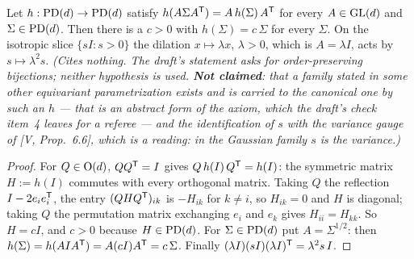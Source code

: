 \begin{lemma}
\label{lem:affine-gauge}
\leanok
Let $h : \mathrm{PD}(d) \to \mathrm{PD}(d)$ satisfy $h(A\Sigma A^{\mathsf{T}}) = A\,h(\Sigma)\,A^{\mathsf{T}}$ for every
$A \in \mathrm{GL}(d)$ and $\Sigma \in \mathrm{PD}(d)$. Then there is a $c > 0$ with $h(\Sigma) = c\,\Sigma$ for
every $\Sigma$. On the isotropic slice $\{sI : s > 0\}$ the dilation $x \mapsto \lambda x$,
$\lambda > 0$, which is $A = \lambda I$, acts by $s \mapsto \lambda^2 s$.
\statusT\quad\emph{(Cites nothing. The draft's statement asks for order-preserving bijections;
neither hypothesis is used. \textbf{Not claimed}: that a family stated in some other
equivariant parametrization exists and is carried to the canonical one by such an $h$ --- that is
an abstract form of the axiom, which the draft's check item~4 leaves for a referee --- and the
identification of $s$ with the variance gauge of [V, Prop.~6.6], which is a reading: in the
Gaussian family $s$ is the variance.)}
\end{lemma}

\begin{proof}
\leanok
For $Q \in \mathrm{O}(d)$, $QQ^{\mathsf{T}} = I$ gives $Q\,h(I)\,Q^{\mathsf{T}} = h(I)$: the symmetric matrix
$H := h(I)$ commutes with every orthogonal matrix. Taking $Q$ the reflection
$I - 2e_ie_i^{\mathsf{T}}$, the entry $(QHQ^{\mathsf{T}})_{ik}$ is $-H_{ik}$ for $k \ne i$, so $H_{ik} = 0$ and
$H$ is diagonal; taking $Q$ the permutation matrix exchanging $e_i$ and $e_k$ gives
$H_{ii} = H_{kk}$. So $H = cI$, and $c > 0$ because $H \in \mathrm{PD}(d)$. For $\Sigma \in \mathrm{PD}(d)$ put
$A = \Sigma^{1/2}$: then $h(\Sigma) = h(AIA^{\mathsf{T}}) = A(cI)A^{\mathsf{T}} = c\,\Sigma$. Finally
$(\lambda I)(sI)(\lambda I)^{\mathsf{T}} = \lambda^2 s\,I$.
\end{proof}

